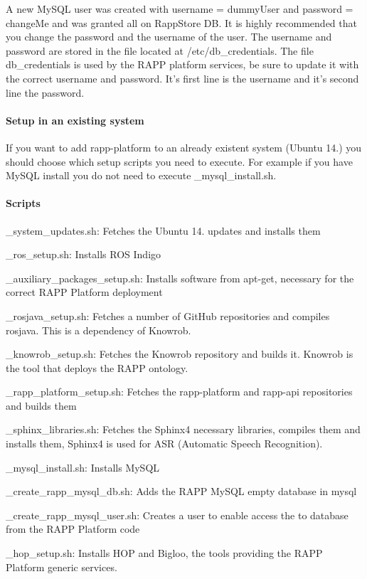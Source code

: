 A new My\-S\-Q\-L user was created with username = {\ttfamily dummy\-User} and password = {\ttfamily change\-Me} and was granted all on Rapp\-Store D\-B. It is highly recommended that you change the password and the username of the user. The username and password are stored in the file located at /etc/db\-\_\-credentials. The file db\-\_\-credentials is used by the R\-A\-P\-P platform services, be sure to update it with the correct username and password. It's first line is the username and it's second line the password.

\paragraph*{Setup in an existing system}

If you want to add rapp-\/platform to an already existent system (Ubuntu 14.) you should choose which setup scripts you need to execute. For example if you have My\-S\-Q\-L install you do not need to execute {\-\_\-mysql\-\_\-install.\-sh}.

\paragraph*{Scripts}


\begin{DoxyItemize}
\item {\-\_\-system\-\_\-updates.\-sh}\-: Fetches the Ubuntu 14. updates and installs them
\item {\-\_\-ros\-\_\-setup.\-sh}\-: Installs R\-O\-S Indigo
\item {\-\_\-auxiliary\-\_\-packages\-\_\-setup.\-sh}\-: Installs software from apt-\/get, necessary for the correct R\-A\-P\-P Platform deployment
\item {\-\_\-rosjava\-\_\-setup.\-sh}\-: Fetches a number of Git\-Hub repositories and compiles rosjava. This is a dependency of Knowrob.
\item {\-\_\-knowrob\-\_\-setup.\-sh}\-: Fetches the Knowrob repository and builds it. Knowrob is the tool that deploys the R\-A\-P\-P ontology.
\item {\-\_\-rapp\-\_\-platform\-\_\-setup.\-sh}\-: Fetches the rapp-\/platform and rapp-\/api repositories and builds them
\item {\-\_\-sphinx\-\_\-libraries.\-sh}\-: Fetches the Sphinx4 necessary libraries, compiles them and installs them, Sphinx4 is used for A\-S\-R (Automatic Speech Recognition).
\item {\-\_\-mysql\-\_\-install.\-sh}\-: Installs My\-S\-Q\-L
\item {\-\_\-create\-\_\-rapp\-\_\-mysql\-\_\-db.\-sh}\-: Adds the R\-A\-P\-P My\-S\-Q\-L empty database in mysql
\item {\-\_\-create\-\_\-rapp\-\_\-mysql\-\_\-user.\-sh}\-: Creates a user to enable access the to database from the R\-A\-P\-P Platform code
\item {\-\_\-hop\-\_\-setup.\-sh}\-: Installs H\-O\-P and Bigloo, the tools providing the R\-A\-P\-P Platform generic services.
\end{DoxyItemize}


